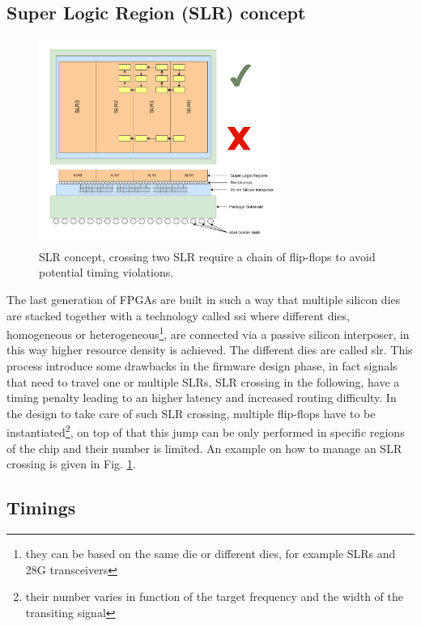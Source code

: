 \documentclass[../../main.tex]{subfiles}
\begin{document}
\subsection{Super Logic Region (SLR) concept}
\label{sec:FPGA_SLR}
\begin{figure}[h]
    \centering
    \includegraphics[width=0.7\textwidth]{sections/04/Images/FPGA_SLRCROSS.pdf}
    \caption{SLR concept, crossing two SLR require a chain of flip-flops to avoid potential timing violations.}
    \label{fig:SLR-CROSS}
\end{figure}
        
The last generation of FPGAs are built in such a way that multiple silicon dies are stacked together with a technology called \acrfull{ssi} where different dies, homogeneous or heterogeneous\footnote{they can be based on the same die or different dies, for example SLRs and 28G transceivers}, are connected via a passive silicon interposer, in this way higher resource density is achieved. The different dies are called \acrfull{slr}. This process introduce some drawbacks in the firmware design phase, in fact signals that need to travel one or multiple SLRs, SLR crossing in the following, have a timing penalty leading to an higher latency and increased routing difficulty.  
In the design to take care of such SLR crossing, multiple flip-flops have to be instantiated\footnote{their number varies in function of the target frequency and the width of the transiting signal}, on top of that this jump can be only performed in specific regions of the chip and their number is limited. An example on how to manage an SLR crossing is given in Fig. \ref{fig:SLR-CROSS}.
        
        
        
\subsection{Timings}
\label{sec:FPGA_timings}
\end{document}
